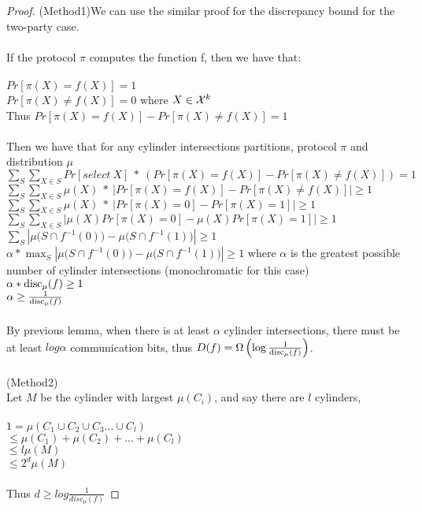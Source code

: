 \begin{proof}
	(Method1)We can use the similar proof for the discrepancy bound for the two-party case.\\
	\\
	If the protocol $\pi$ computes the function f, then we have that:\\
	\\
	$Pr[\pi(X) = f(X)] = 1$\\
	$Pr[\pi(X) \neq f(X)] = 0$ where $X \in \mathcal{X}^k$\\
	Thus $Pr[\pi(X) = f(X)] - Pr[\pi(X) \neq f(X)]= 1$\\
	\\
	Then we have that for any cylinder intersections partitions, protocol $\pi$ and distribution $\mu$\\
	$\sum_{S}\sum_{X\in S} Pr[select\ X]\ *\ (Pr[\pi(X) = f(X)] - Pr[\pi(X) \neq f(X)]) = 1$\\
	$\sum_{S}\sum_{X\in S} \mu(X)\ *\ |Pr[\pi(X) = f(X)] - Pr[\pi(X) \neq f(X)]| \ge 1$\\
	$\sum_{S}\sum_{X\in S} \mu(X)\ *\ |Pr[\pi(X) = 0] - Pr[\pi(X) = 1]| \ge 1$\\
	$\sum_{S}\sum_{X\in S} |\mu(X)Pr[\pi(X) = 0] - \mu(X)Pr[\pi(X) = 1]| \ge 1$\\
	$\sum_{S} |\mu\big( S \cap f^{-1}(0) \big) - \mu\big( S \cap f^{-1}(1)\big)|  \ge 1$\\
	$\alpha * \max_{S} |\mu\big( S \cap f^{-1}(0) \big) - \mu\big( S \cap f^{-1}(1)\big)|  \ge 1$ where $\alpha$ is the greatest possible number of cylinder intersections (monochromatic for this case)\\
	$\alpha * \mathrm{disc}_\mu(f) \ge 1$\\
	$\alpha \ge \frac{1}{\mathrm{disc}_\mu(f)}$\\
	\\
	By previous lemma, when there is at least $\alpha$ cylinder intersections, there must be at least $log\alpha$ communication bits, thus $D(f) = \Omega\left( \log \frac{1}{\mathrm{disc}_\mu(f)}\right)$.\\
	\\
	(Method2)\\
	Let $M$ be the cylinder with largest $\mu(C_i)$, and say there are $l$ cylinders,\\
	\\
	$1=\mu(C_1\cup C_2\cup C_3...\cup C_l)$\\
	$\leq \mu(C_1)+\mu(C_2)+...+\mu(C_l)$\\
	$\leq l\mu(M)$\\
	$\leq 2^d\mu(M)$\\
	\\
	Thus $d\ge log\frac{1}{disc_{\mu}(f)}$
\end{proof}

